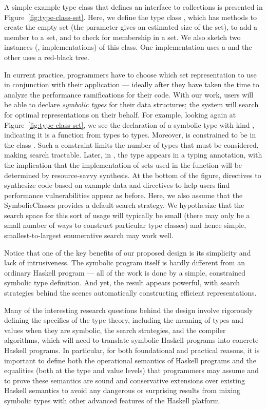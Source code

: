 A simple example type class that defines an interface to collections
is presented in Figure~\ref{fig:type-class-set}.  Here, we define the type
class , which has methods  to create the empty set
(the parameter gives an estimated size of the set),  to add
a member to a set, and  to check for membership in a set.
We also sketch two instances (\ie, implementations) of this class.
One implementation uses a  and the other uses a red-black
tree.

In current practice, programmers have to choose which set
representation to use in conjunction with their application ---
ideally after they have taken the time to analyze the performance
ramifications for their code.  With our work, users will be able to
declare \emph{symbolic types} for their data structures; the system
will search for optimal representations on their behalf.  For example,
looking again at Figure~\ref{fig:type-class-set}, we see the declaration
of a symbolic type  with kind \cd{* -> *}, indicating it is a
function from types to types.  Moreover,  is constrained to be
in the class .  Such a constraint limits the number of types that
must be considered, making search tractable.  Later, in ,
the type  appears in a typing annotation, with the implication that the
implementation of sets used in the  function will be
determined by resource-savvy synthesis.  At the bottom of the figure,
directives to synthesize code based on example data and directives to
help users find performance vulnerabilities appear as before.  Here,
we also assume that the SymbolicClasses \rasp provides a default
search strategy.  We hypothesize that the search space
for this sort of usage will typically be small (there may only be a small
number of ways to construct particular type classes) and hence simple,
smallest-to-largest enumerative search may work well.

Notice that one of the key benefits of our proposed design is its simplicity and lack of intrusiveness.
The symbolic program itself is hardly different from an ordinary Haskell program --- all of the work is
done by a simple, constrained symbolic type definition.  And yet, the result appears powerful, with
search strategies behind the scenes automatically constructing efficient representations.

Many of the interesting research questions behind the design involve rigorously defining the specifics of the
type theory, including the meaning of types and values when they are symbolic, the search strategies, and
the compiler algorithms, which will need to translate symbolic Haskell programs into concrete Haskell programs.
In particular, for both foundational and practical reasons, it is important to define both the operational
semantics of Haskell programs and the equalities (both at the type and value levels) that programmers
may assume and to prove these semantics are sound and conservative extensions over existing Haskell semantics
to avoid any dangerous or surprising results from mixing symbolic types with other advanced features of
the Haskell platform.

